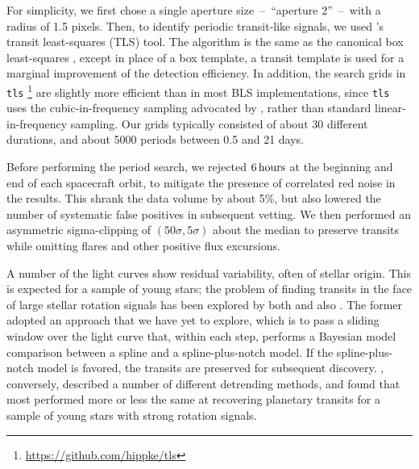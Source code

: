 \documentclass[12pt,twocolumn,tighten]{aastex62}
\begin{document}
For simplicity, we first chose a single aperture size~--~``aperture
2''~--~with a radius of 1.5  pixels.  Then, to identify periodic
transit-like signals, we used \citet{hippke_TLS_2019}'s transit
least-squares (TLS) tool.  The algorithm is the same as the canonical
box least-squares \citep{kovacs_box-fitting_2002}, except in place of
a box template, a transit template is used  for a marginal improvement
of the detection efficiency.  In addition, the search grids in
\texttt{tls} \footnote{\url{https://github.com/hippke/tls}} are
slightly more efficient than in most BLS implementations, since
\texttt{tls} uses the cubic-in-frequency sampling advocated by
\citet{ofir_optimizing_2014}, rather than standard linear-in-frequency
sampling.  Our grids typically consisted of about 30 different
durations, and about 5000 periods between 0.5 and 21 days. 

Before performing the period search, we rejected $6\,{\rm hours}$ at
the beginning and end of each spacecraft orbit, to mitigate the
presence of correlated red noise in the results.  This shrank the data
volume by about 5\%, but also lowered the number of systematic false
positives in subsequent vetting.  We then performed an asymmetric
sigma-clipping of $(50\sigma,5\sigma)$ about the median to preserve
transits while omitting flares and other positive flux excursions. 

A number of the light curves show residual variability, often of
stellar origin.  This is expected for a sample of young stars; the
problem of finding transits in the face of large stellar rotation
signals has been explored by both \citet{rizzuto_zeitV_2017} and also
\citet{hippke_wotan_2019}.  The former adopted an approach that we
have yet to explore, which is to pass a sliding window over the light
curve that, within each step, performs a Bayesian model comparison
between a spline and a spline-plus-notch model.  If the
spline-plus-notch model is favored, the transits are preserved for
subsequent discovery.  \citet{hippke_wotan_2019}, conversely,
described a number of different detrending methods, and found that
most performed more or less the same at recovering planetary transits
for a sample of young stars with strong rotation signals.
\end{document}
